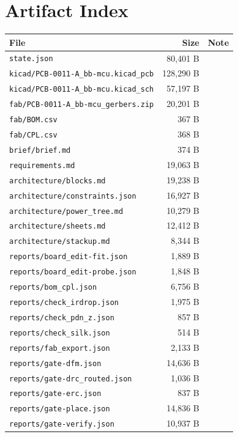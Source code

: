 \documentclass[11pt,a4paper]{article}
\begin{document}
\section{Artifact Index}
{\small
\begin{longtable}{p{9cm}rp{4cm}}
\toprule
\textbf{File} & \textbf{Size} & \textbf{Note} \\
\midrule
\endhead
\texttt{state.json} & 80,401 B &  \\
\texttt{kicad/PCB-0011-A\_bb-mcu.kicad\_pcb} & 128,290 B &  \\
\texttt{kicad/PCB-0011-A\_bb-mcu.kicad\_sch} & 57,197 B &  \\
\texttt{fab/PCB-0011-A\_bb-mcu\_gerbers.zip} & 20,201 B &  \\
\texttt{fab/BOM.csv} & 367 B &  \\
\texttt{fab/CPL.csv} & 368 B &  \\
\texttt{brief/brief.md} & 374 B &  \\
\texttt{requirements.md} & 19,063 B &  \\
\texttt{architecture/blocks.md} & 19,238 B &  \\
\texttt{architecture/constraints.json} & 16,927 B &  \\
\texttt{architecture/power\_tree.md} & 10,279 B &  \\
\texttt{architecture/sheets.md} & 12,412 B &  \\
\texttt{architecture/stackup.md} & 8,344 B &  \\
\texttt{reports/board\_edit-fit.json} & 1,889 B &  \\
\texttt{reports/board\_edit-probe.json} & 1,848 B &  \\
\texttt{reports/bom\_cpl.json} & 6,756 B &  \\
\texttt{reports/check\_irdrop.json} & 1,975 B &  \\
\texttt{reports/check\_pdn\_z.json} & 857 B &  \\
\texttt{reports/check\_silk.json} & 514 B &  \\
\texttt{reports/fab\_export.json} & 2,133 B &  \\
\texttt{reports/gate-dfm.json} & 14,636 B &  \\
\texttt{reports/gate-drc\_routed.json} & 1,036 B &  \\
\texttt{reports/gate-erc.json} & 837 B &  \\
\texttt{reports/gate-place.json} & 14,836 B &  \\
\texttt{reports/gate-verify.json} & 10,937 B &  \\

\end{longtable}}
\end{document}
